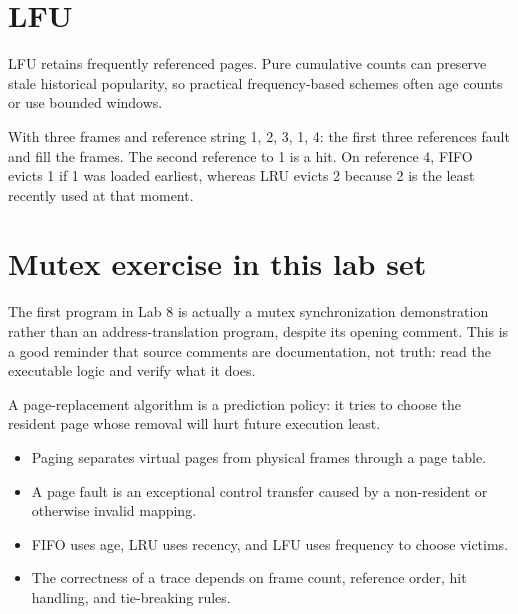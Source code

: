 \section{LFU}
LFU retains frequently referenced pages. Pure cumulative counts can preserve stale historical popularity, so practical frequency-based schemes often age counts or use bounded windows.

\begin{workedexample}
With three frames and reference string 1, 2, 3, 1, 4: the first three references fault and fill the frames. The second reference to 1 is a hit. On reference 4, FIFO evicts 1 if 1 was loaded earliest, whereas LRU evicts 2 because 2 is the least recently used at that moment.
\end{workedexample}

\section{Mutex exercise in this lab set}
The first program in Lab 8 is actually a mutex synchronization demonstration rather than an address-translation program, despite its opening comment. This is a good reminder that source comments are documentation, not truth: read the executable logic and verify what it does.

\begin{keyidea}
A page-replacement algorithm is a prediction policy: it tries to choose the resident page whose removal will hurt future execution least.
\end{keyidea}





\begin{chapterrecap}
\begin{itemize}
  \item Paging separates virtual pages from physical frames through a page table.
  \item A page fault is an exceptional control transfer caused by a non-resident or otherwise invalid mapping.
  \item FIFO uses age, LRU uses recency, and LFU uses frequency to choose victims.
  \item The correctness of a trace depends on frame count, reference order, hit handling, and tie-breaking rules.
\end{itemize}
\end{chapterrecap}
